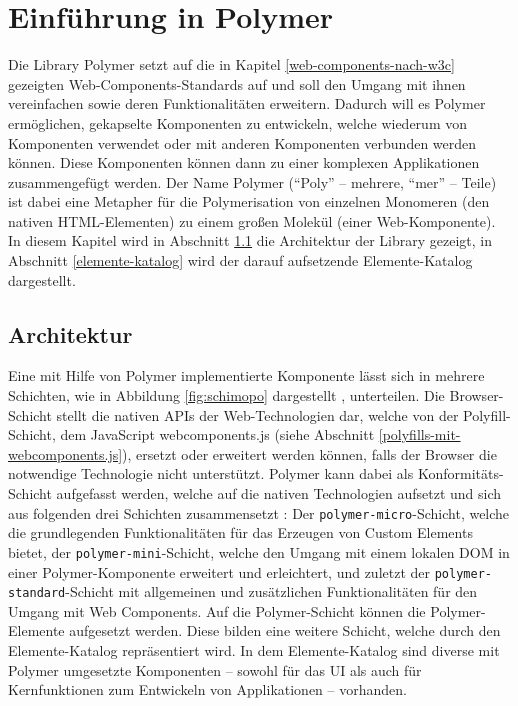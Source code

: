 \chapter{Einführung in Polymer}\label{einfuehrung-in-polymer}

Die Library Polymer setzt auf die in Kapitel \ref{web-components-nach-w3c} gezeigten Web-Components-Standards auf und soll den Umgang mit ihnen vereinfachen sowie deren Funktionalitäten erweitern. Dadurch will es Polymer ermöglichen, gekapselte Komponenten zu entwickeln, welche wiederum von Komponenten verwendet oder mit anderen Komponenten verbunden werden können. Diese Komponenten können dann zu einer komplexen Applikationen zusammengefügt werden. Der Name Polymer (``Poly'' -- mehrere, ``mer'' -- Teile) ist dabei eine Metapher für die Polymerisation von einzelnen Monomeren (den nativen \ac{HTML}-Elementen) zu einem großen Molekül (einer Web-Komponente). In diesem Kapitel wird in Abschnitt \ref{architektur} die Architektur der Library gezeigt, in Abschnitt \ref{elemente-katalog} wird der darauf aufsetzende Elemente-Katalog dargestellt.


\section{Architektur}\label{architektur}

Eine mit Hilfe von Polymer implementierte Komponente lässt sich in mehrere Schichten, wie in Abbildung \ref{fig:schimopo} dargestellt \cite{citeulike:13931267}, unterteilen. Die Browser-Schicht stellt die nativen \ac{API}s der Web-Technologien dar, welche von der Polyfill-Schicht, dem JavaScript webcomponents.js (siehe Abschnitt \ref{polyfills-mit-webcomponents.js}), ersetzt oder erweitert werden können, falls der Browser die notwendige Technologie nicht unterstützt. Polymer kann dabei als Konformitäts-Schicht aufgefasst werden, welche auf die nativen Technologien aufsetzt und sich aus folgenden drei Schichten zusammensetzt \cite{citeulike:13915080}: Der \texttt{polymer-micro}-Schicht, welche die grundlegenden Funktionalitäten für das Erzeugen von Custom Elements bietet, der \texttt{polymer-mini}-Schicht, welche den Umgang mit einem lokalen \ac{DOM} in einer Polymer-Komponente erweitert und erleichtert, und zuletzt der \texttt{polymer-standard}-Schicht mit allgemeinen und zusätzlichen Funktionalitäten für den Umgang mit Web Components. Auf die Polymer-Schicht können die Polymer-Elemente aufgesetzt werden. Diese bilden eine weitere Schicht, welche durch den Elemente-Katalog \cite{citeulike:13916374} repräsentiert wird. In dem Elemente-Katalog sind diverse mit Polymer umgesetzte Komponenten -- sowohl für das \ac{UI} als auch für Kernfunktionen zum Entwickeln von Applikationen -- vorhanden.

